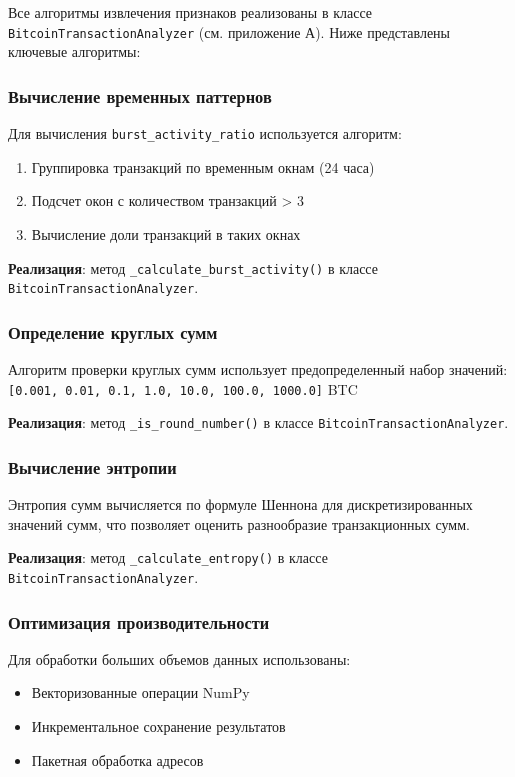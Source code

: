 Все алгоритмы извлечения признаков реализованы в классе \texttt{BitcoinTransactionAnalyzer} (см. приложение А). Ниже представлены ключевые алгоритмы:

\subsubsection{Вычисление временных паттернов}

Для вычисления \texttt{burst\_activity\_ratio} используется алгоритм:
\begin{enumerate}
    \item Группировка транзакций по временным окнам (24 часа)
    \item Подсчет окон с количеством транзакций > 3
    \item Вычисление доли транзакций в таких окнах
\end{enumerate}

\textbf{Реализация}: метод \texttt{\_calculate\_burst\_activity()} в классе \texttt{BitcoinTransactionAnalyzer}.

\subsubsection{Определение круглых сумм}

Алгоритм проверки круглых сумм использует предопределенный набор значений:
\texttt{[0.001, 0.01, 0.1, 1.0, 10.0, 100.0, 1000.0]} BTC

\textbf{Реализация}: метод \texttt{\_is\_round\_number()} в классе \texttt{BitcoinTransactionAnalyzer}.

\subsubsection{Вычисление энтропии}

Энтропия сумм вычисляется по формуле Шеннона для дискретизированных значений сумм, что позволяет оценить разнообразие транзакционных сумм.

\textbf{Реализация}: метод \texttt{\_calculate\_entropy()} в классе \texttt{BitcoinTransactionAnalyzer}.

\subsubsection{Оптимизация производительности}

Для обработки больших объемов данных использованы:
\begin{itemize}
    \item Векторизованные операции NumPy
    \item Инкрементальное сохранение результатов
    \item Пакетная обработка адресов
\end{itemize}


